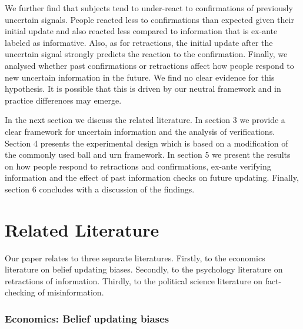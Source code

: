 \documentclass{article}
\begin{document}
We further find that subjects tend to under-react to confirmations of previously uncertain signals. People reacted less to confirmations than expected given their initial update and also reacted less compared to information that is ex-ante labeled as informative. Also, as for retractions, the initial update after the uncertain signal strongly predicts the reaction to the confirmation. Finally, we analysed whether past confirmations or retractions affect how people respond to new uncertain information in the future. We find no clear evidence for this hypothesis. It is possible that this is driven by our neutral framework and in practice differences may emerge.

In the next section we discuss the related literature. In section 3 we provide a clear framework for uncertain information and the analysis of verifications. Section 4 presents the experimental design which is based on a modification of the commonly used ball and urn framework. In section 5 we present the results on how people respond to retractions and confirmations, ex-ante verifying information and the effect of past information checks on future updating. Finally, section 6 concludes with a discussion of the findings.


\section{Related Literature}

Our paper relates to three separate literatures. Firstly, to the economics literature on belief updating biases. Secondly, to the psychology literature on retractions of information. Thirdly, to the political science literature on fact-checking of misinformation.

\subsubsection*{Economics: Belief updating biases}
\end{document}
